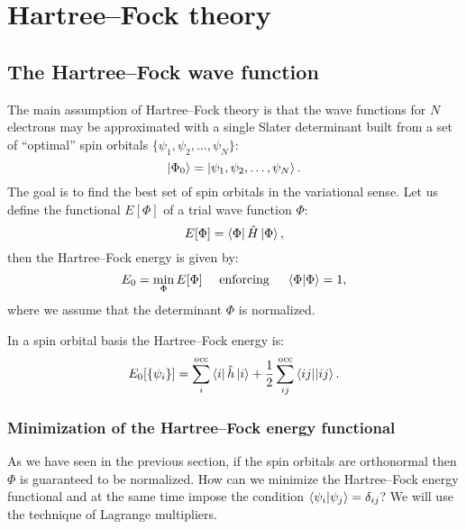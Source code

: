 \documentclass[../Main/chem532-notes.tex]{subfiles}
\begin{document}
\chapter{Hartree--Fock theory}

\section{The Hartree--Fock wave function}
The main assumption of Hartree--Fock theory is that the wave functions for $N$ electrons may be approximated with a single Slater determinant built from a set of ``optimal'' spin orbitals $\{ \psi_1, \psi_2, \ldots, \psi_N \}$:
\begin{equation}
\ket{\Phi_0} = \ket{\psi_1, \psi_2, \ldots, \psi_N }.
\end{equation}
The goal is to find the best set of spin orbitals in the variational sense. 
Let us define the functional $E[\Phi]$ of a trial wave function $\Phi$:
\begin{equation}
E[\Phi] = \bra{\Phi} \hat{H} \ket{\Phi},
\end{equation}
then the Hartree--Fock energy is given by:
\begin{equation}
E_0 = \min_{\Phi} E[\Phi] \quad \text{ enforcing }  \quad\braket{\Phi | \Phi} = 1,
\end{equation}
where we assume that the determinant $\Phi$ is normalized.

In a spin orbital basis the Hartree--Fock energy is:
\begin{equation}
E_0[\{ \psi_i \}] = \sum_i^{\rm occ} \bra{i} \hat{h} \ket{i} + \frac{1}{2} \sum_{ij}^{\rm occ} \bra{ij}\!\ket{ij}.
\end{equation}


\subsection{Minimization of the Hartree--Fock energy functional}
As we have seen in the previous section, if the spin orbitals are orthonormal then $\Phi$ is guaranteed to be normalized.
How can we minimize the Hartree--Fock energy functional and at the same time impose the condition $\braket{\psi_i|\psi_j} = \delta_{ij}$?
We will use the technique of Lagrange multipliers.
\end{document}
